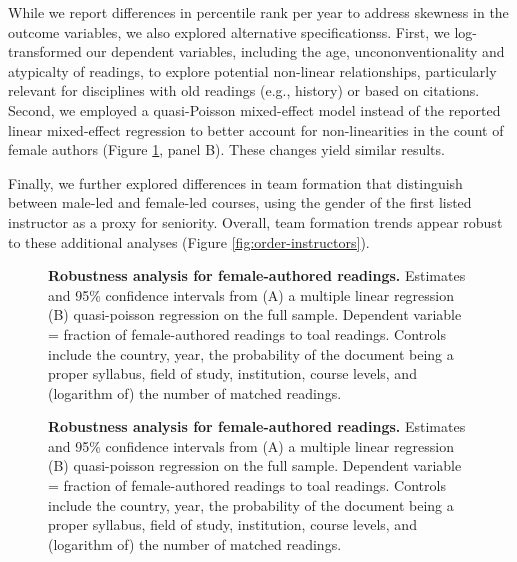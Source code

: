 \documentclass[
  british,
  11pt,
]{article}
\begin{document}
While we report differences in percentile rank per year to address skewness in the outcome variables, we also explored alternative specificationss. First, we log-transformed our dependent variables, including the age, uncononventionality and atypicalty of readings, to explore potential non-linear relationships, particularly relevant for disciplines with old readings (e.g., history) or based on citations. Second, we employed a quasi-Poisson mixed-effect model instead of the reported linear mixed-effect regression to better account for non-linearities in the count of female authors (Figure \ref{fig:robust-women}, panel B). These changes yield similar results.

Finally, we further explored differences in team formation that distinguish between male-led and female-led courses, using the gender of the first listed instructor as a proxy for seniority. Overall, team formation trends appear robust to these additional analyses (Figure \ref{fig:order-instructors}).

\begin{figure}
\centering
{\label{fig:robust-women}\textbf{Robustness analysis for female-authored readings.} Estimates and 95\% confidence intervals from (A) a multiple linear regression (B) quasi-poisson regression on the full sample. Dependent variable = fraction of female-authored readings to toal readings. Controls include the country, year, the probability of the document being a proper syllabus, field of study, institution, course levels, and (logarithm of) the number of matched readings.}
\caption{\label{fig:robust-women}\textbf{Robustness analysis for female-authored readings.} Estimates and 95\% confidence intervals from (A) a multiple linear regression (B) quasi-poisson regression on the full sample. Dependent variable = fraction of female-authored readings to toal readings. Controls include the country, year, the probability of the document being a proper syllabus, field of study, institution, course levels, and (logarithm of) the number of matched readings.}
\end{figure}
\end{document}
